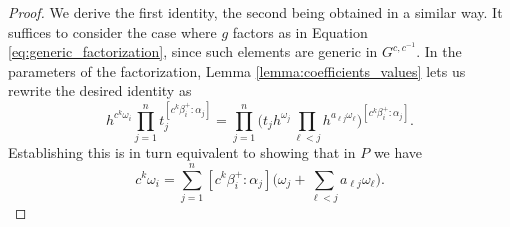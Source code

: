 \documentclass[12pt]{amsart}
\newcommand{\RR}{\mathbb{R}}
\theoremstyle{remark}
\numberwithin{equation}{section}
\numberwithin{figure}{section}
\begin{document}
\begin{proof}
  We derive the first identity, the second being obtained in a similar way. It suffices to consider the case where $g$ factors as in Equation \ref{eq:generic_factorization}, since such elements are generic in $G^{c,c^{-1}}$.  
  In the parameters of the factorization, Lemma \ref{lemma:coefficients_values} lets us rewrite the desired identity as
\[
h^{c^k\omega_i}\prod_{j=1}^n t_{j}^{[c^k\beta_i^+:\alpha_j]} = \prod_{j=1}^n\Big( 
    t_j
    h^{\omega_j}\prod_{ \ell <j}h^{a_{\ell j}\omega_ \ell }\Big)^{[c^k\beta_i^+:\alpha_j]}.
\]
Establishing this is in turn equivalent to showing that in $P$ we have
  \begin{equation}\label{eq:coxeter_identity_omega}
    c^k\omega_i 
    =
    \sum_{j=1}^n
    [c^k\beta_i^+:\alpha_j]
    \Big(
    \omega_j+
    \sum_{\ell<j} a_{\ell j}\omega_\ell
    \Big).
  \end{equation}



\end{proof}
\end{document}
